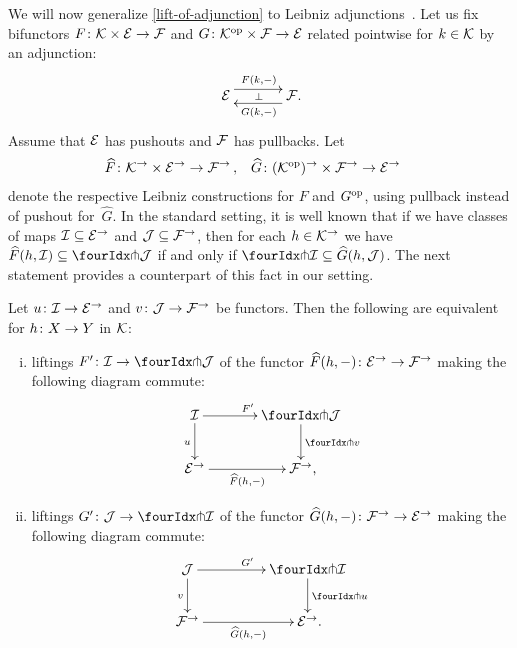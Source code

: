 \documentclass[reqno,10pt,a4paper,oneside,draft]{amsart}
\begin{document}
We will now generalize \cref{lift-of-adjunction} to Leibniz adjunctions~\cite{riehl-verity:reedy}.
Let us fix bifunctors $F \co \cal{K} \times \catE \to \cal{F}$ and $G \co \cal{K}^{\op} \times \cal{F} \to \catE$ related pointwise for $k \in \cal{K}$ by an adjunction:
\[
\xymatrix@C+1em{
  \catE
  \ar@<5pt>[r]^{F(k, \arghole)}
  \ar@{}[r]|{\bot}
&
  \cal{F}
  \ar@<5pt>[l]^{G(k, \arghole)}
\rlap{.}}
\]
Assume that $\catE$ has pushouts and $\cal{F}$ has pullbacks.
Let
\[
\begin{aligned}
  \widehat{F} &\co \cal{K}^\to \times \catE^\to \to \cal{F}^\to
\, ,&
  \widehat{G} &\co (\cal{K}^{\op})^\to \times \cal{F}^\to \to \catE^\to
\end{aligned}
\]
denote the respective Leibniz constructions for $F$ and $G^{\op}$, using pullback instead of pushout for~$\widehat{G}$.
In the standard setting, it is well known that if we have classes of maps $\cal{I} \subseteq \catE^\to$ and $\cal{J} \subseteq \cal{F}^\to$, then for each $h \in \cal{K}^\to$ we have $\widehat{F}(h, \cal{I}) \subseteq \liftl{\cal{J}}$ if and only if $\liftr{\cal{I}} \subseteq \widehat{G}(h, \cal{J})$.
The next statement provides a counterpart of this fact in our setting.

\begin{proposition} \label{lift-of-leibniz-adjunction}
Let $u \co \cal{I} \to \catE^\to$ and $v \co \cal{J} \to \cal{F}^\to$ be functors.
Then the following are equivalent for $h \co X \to Y$ in $\cal{K}$:
\begin{enumerate}[(i)]
\item liftings $F' \co \cal{I} \to \liftl{\cal{J}}$ of the functor $\widehat{F}(h, \arghole) \co \catE^\to \to \cal{F}^\to$ making the following diagram commute:
\[
\xymatrix@C=1.2cm{
  \cal{I}
  \ar[r]^{F'}
  \ar[d]_{u}
&
  \liftl{\cal{J}}
  \ar[d]^{\liftl{v}}
\\
  \catE^\to
  \ar[r]_-{\widehat{F}(h, \arghole)}
&
  \cal{F}^\to
\rlap{,}}
\]
\item liftings $G' \co \cal{J} \to \liftr{\cal{I}}$ of the functor $\widehat{G}(h, \arghole) \co \cal{F}^\to \to \catE^\to$ making the following diagram commute:
\[
\xymatrix@C+2em{
  \cal{J}
  \ar[d]_{v}
  \ar[r]^{G'}
&
  \liftr{\cal{I}}
  \ar[d]^{\liftr{u}}
\\
  \cal{F}^\to
  \ar[r]_-{\widehat{G}(h, \arghole)}
&
  \catE^\to
\rlap{.}}
\]
\end{enumerate}
\end{proposition}
\end{document}
